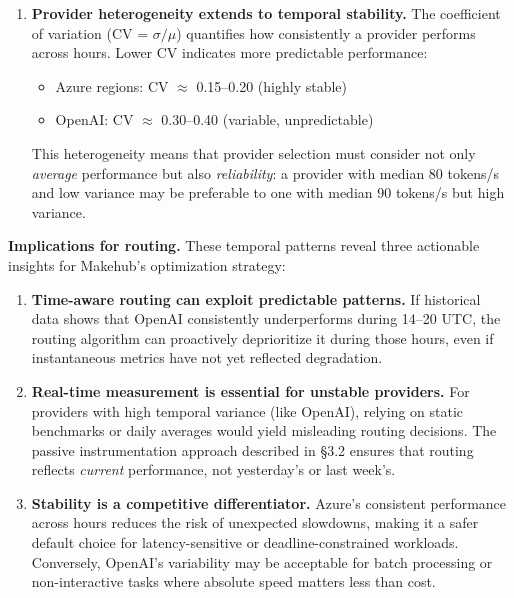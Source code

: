 \documentclass[english]{article}
\begin{document}
\begin{enumerate}
\item \textbf{Provider heterogeneity extends to temporal stability.} The coefficient of variation (CV = $\sigma/\mu$) quantifies how consistently a provider performs across hours. Lower CV indicates more predictable performance:
\begin{itemize}
    \item Azure regions: CV $\approx$ 0.15--0.20 (highly stable)
    \item OpenAI: CV $\approx$ 0.30--0.40 (variable, unpredictable)
\end{itemize}
This heterogeneity means that provider selection must consider not only \emph{average} performance but also \emph{reliability}: a provider with median 80 tokens/s and low variance may be preferable to one with median 90 tokens/s but high variance.
\end{enumerate}

\medskip

\noindent\textbf{Implications for routing.} These temporal patterns reveal three actionable insights for Makehub's optimization strategy:

\begin{enumerate}
\item \textbf{Time-aware routing can exploit predictable patterns.} If historical data shows that OpenAI consistently underperforms during 14--20 UTC, the routing algorithm can proactively deprioritize it during those hours, even if instantaneous metrics have not yet reflected degradation.

\item \textbf{Real-time measurement is essential for unstable providers.} For providers with high temporal variance (like OpenAI), relying on static benchmarks or daily averages would yield misleading routing decisions. The passive instrumentation approach described in §3.2 ensures that routing reflects \emph{current} performance, not yesterday's or last week's.

\item \textbf{Stability is a competitive differentiator.} Azure's consistent performance across hours reduces the risk of unexpected slowdowns, making it a safer default choice for latency-sensitive or deadline-constrained workloads. Conversely, OpenAI's variability may be acceptable for batch processing or non-interactive tasks where absolute speed matters less than cost.
\end{enumerate}

\medskip
\end{document}

